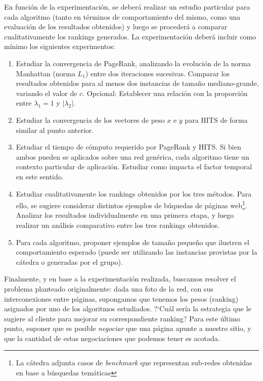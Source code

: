 \documentclass[11pt, a4paper]{article}
\begin{document}
En funci\'on de la experimentaci\'on, se deber\'a realizar un estudio particular para cada algoritmo (tanto en t\'erminos de comportamiento
del mismo, como una evaluaci\'on de los resultados obtenidos) y luego se proceder\'a a comparar cualitativamente los rankings generados.
La experimentaci\'on deber\'a incluir como m\'inimo los siguientes experimentos:
\begin{enumerate}
\item Estudiar la convergencia de PageRank, analizando la evoluci\'on de la norma Manhattan (norma $L_1$) entre dos iteraciones sucesivas. Comparar
los resultados obtenidos para al menos dos instancias de tama\~no mediano-grande, variando el valor de $c$. Opcional: Establecer una relaci\'on 
con la proporci\'on entre $\lambda_1 = 1$ y $|\lambda_2|$.
\item Estudiar la convergencia de los vectores de peso $x$ e $y$ para HITS de forma similar al punto anterior.
\item Estudiar el tiempo de c\'omputo requerido por PageRank y HITS. Si bien ambos pueden se aplicados sobre una red gen\'erica, cada algoritmo 
tiene un contexto particular de aplicaci\'on. Estudiar como impacta el factor temporal en este sentido.
\item Estudiar cualitativamente los rankings obtenidos por los tres m\'etodos. Para ello, se sugiere considerar distintos ejemplos de b\'uquedas
de p\'aginas web\footnote{La c\'atedra adjunta casos de \emph{benchmark} que representan sub-redes obtenidas en base a b\'usquedas tem\'aticas}.
Analizar los resultados individualmente en una primera etapa, y luego realizar un an\'alisis comparativo entre los tres rankings obtenidos.
\item Para cada algoritmo, proponer ejemplos de tama\~no peque\~no que ilustren el comportamiento esperado (puede ser utilizando las instancias
provistas por la c\'atedra o generadas por el grupo).
\end{enumerate}

Finalmente, y en base a la experimentaci\'on realizada, buscamos resolver el problema planteado originalmente: dada una foto de la red, con sus
interconexiones entre p\'aginas, supongamos que tenemos los pesos (ranking) asignados por uno de los algoritmos estudiados. ?`Cu\'al ser\'ia la
estrategia que le sugiere al cliente para mejorar su correspondiente ranking? Para este \'ultimo punto, suponer que es posible \emph{negociar}
que una p\'agina apunte a nuestro sitio, y que la cantidad de estas negociaciones que podemos tener es acotada.
\end{document}
